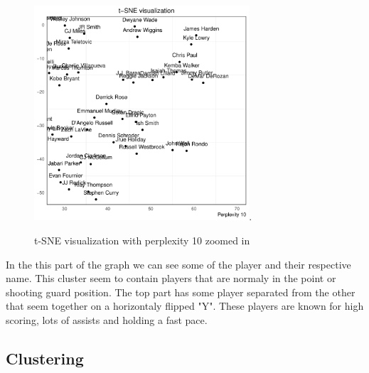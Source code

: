 \documentclass{article}
\begin{document}
 
\begin{figure}[H]
 \centering
 \includegraphics[height=8cm]{zoom10}.
 \caption{t-SNE visualization with perplexity 10 zoomed in}
 \label{figure:2}
\end{figure}

In the this part of the graph we can see some of the player and their respective name. This cluster seem to contain players that are normaly in the point or shooting guard position. The top part has some player separated from the other that seem together on a horizontaly flipped "Y". These players are known for high scoring, lots of assists and holding a fast pace.
 
\newpage 
 
\subsection{Clustering} 


\begin{table}[ht]
\centering
{}
\caption{EM algorithm 10 cluster result: average shooting stats} 
\end{table}
\end{document}

